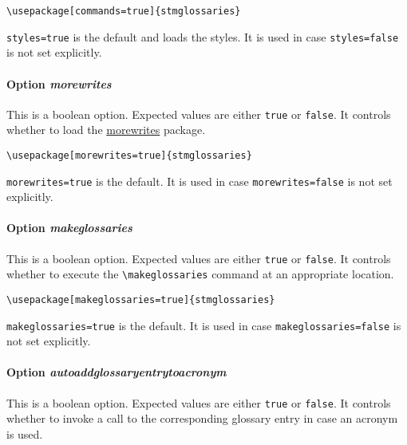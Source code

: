 \documentclass[%
  type=article,%
  layout=koma,%
  hyperref=true,%
  conditionallox=true,%
  conditionalloxnewpage=false,%
  date=true,%
  index=true,%
  listings=true%
]{stmtext}
\begin{document}
\begin{verbatim}
\usepackage[commands=true]{stmglossaries}
\end{verbatim}

\texttt{styles=true} is the default and loads the styles. It is used in case \texttt{styles=false} is not set explicitly.

\paragraph{Option \protect\textit{morewrites}}
\label{sec:usage:preamble:wholepackage:options:morewrites}

This is a boolean option. Expected values are either \texttt{true} or \texttt{false}. It controls whether to load the \href{https://ctan.org/pkg/morewrites?lang=en}{morewrites} package.

\begin{verbatim}
\usepackage[morewrites=true]{stmglossaries}
\end{verbatim}

\texttt{morewrites=true} is the default. It is used in case \texttt{morewrites=false} is not set explicitly.

\paragraph{Option \protect\textit{makeglossaries}}
\label{sec:usage:preamble:wholepackage:options:makeglossaries}

This is a boolean option. Expected values are either \texttt{true} or \texttt{false}. It controls whether to execute the \texttt{\textbackslash makeglossaries} command at an appropriate location.

\begin{verbatim}
\usepackage[makeglossaries=true]{stmglossaries}
\end{verbatim}

\texttt{makeglossaries=true} is the default. It is used in case \texttt{makeglossaries=false} is not set explicitly.

\paragraph{Option \protect\textit{autoaddglossaryentrytoacronym}}
\label{sec:usage:preamble:wholepackage:options:autoaddglossaryentrytoacronym}

This is a boolean option. Expected values are either \texttt{true} or \texttt{false}. It controls whether to invoke a call to the corresponding glossary entry in case an acronym is used. 
\end{document}
